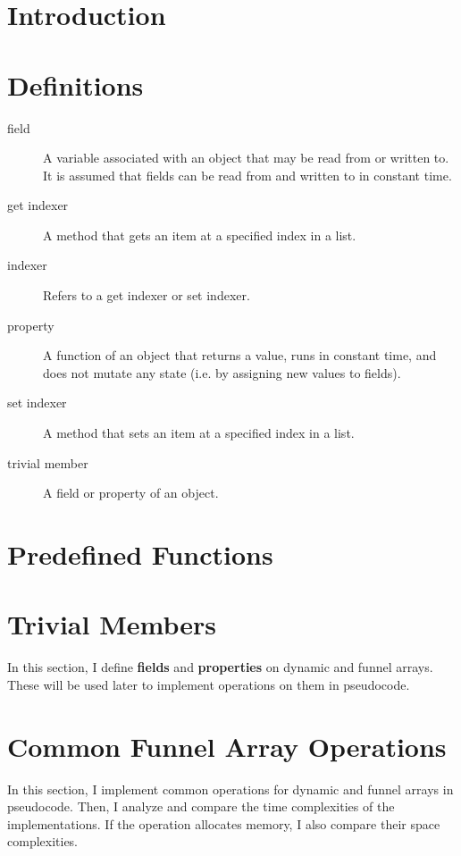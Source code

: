 \documentclass{article}
\begin{document}
	\begin{abstract}
	\end{abstract}

	\section{Introduction}

	\section{Definitions}
	
	\begin{description}
		\item[field] A variable associated with an object that may be read from or written to.\\
			It is assumed that fields can be read from and written to in constant time.
		\item[get indexer] A method that gets an item at a specified index in a list.
		\item[indexer] Refers to a get indexer or set indexer.
		\item[property] A function of an object that returns a value, runs in constant time, and does not mutate any state (i.e. by assigning new values to fields).
		\item[set indexer] A method that sets an item at a specified index in a list.
		\item[trivial member] A field or property of an object.
	\end{description}

	\section{Predefined Functions}
	
	\section{Trivial Members}
	
	In this section, I define \textbf{fields} and \textbf{properties} on dynamic and funnel arrays. These will be used later to implement operations on them in pseudocode.
	
	\section{Common Funnel Array Operations}
	
	In this section, I implement common operations for dynamic and funnel arrays in pseudocode. Then, I analyze and compare the time complexities of the implementations. If the operation allocates memory, I also compare their space complexities.
	
\end{document}
